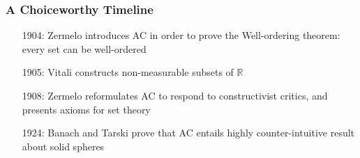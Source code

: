 \begin{frame}
\frametitle{A Choiceworthy Timeline}

\begin{itemize}[<+->]

\item[1904:] Zermelo introduces AC in order to prove the Well-ordering theorem: every set can be well-ordered

\item[1905:] Vitali constructs non-measurable subsets of $\mathbb{R}$

\item[1908:] Zermelo reformulates AC to respond to constructivist critics, and presents axioms for set theory 


\item[1924:] Banach and Tarski prove that AC entails highly counter-intuitive result about solid spheres


\end{itemize}
\end{frame}
